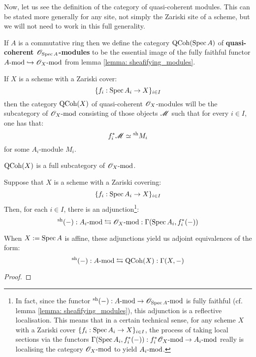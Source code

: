         Now, let us see the definition of the category of quasi-coherent modules. This can be stated more generally for any site, not simply the Zariski site of a scheme, but we will not need to work in this full generality.
        \begin{definition} \label{def: quasi_coherent_modules}
            If $A$ is a commutative ring then we define the category $\QCoh(\Spec A)$ of \textbf{quasi-coherent $\scrO_{\Spec A}$-modules} to be the essential image of the fully faithful functor $A\mod \hookrightarrow \scrO_X\mod$ from lemma \ref{lemma: sheafifying_modules}.

            If $X$ is a scheme with a Zariski cover:
                $$\{ f_i: \Spec A_i \to X \}_{i \in I}$$
            then the category $\QCoh(X)$ of quasi-coherent $\scrO_X$-modules will be the subcategory of $\scrO_X\mod$ consisting of those objects $\scrM$ such that for every $i \in I$, one has that:
                $$f_i^*\scrM \cong {}^{\sh}M_i$$
            for some $A_i$-module $M_i$.
        \end{definition}
        \begin{remark}
            $\QCoh(X)$ is a full subcategory of $\scrO_X\mod$.
        \end{remark}
        \begin{theorem} \label{theorem: qcoh_global_section_functor_admits_right_adjoint}
            Suppose that $X$ is a scheme with a Zariski covering:
                $$\{f_i: \Spec A_i \to X\}_{i \in I}$$
            Then, for each $i \in I$, there is an adjunction\footnote{In fact, since the functor ${}^{\sh}(-): A\mod \to \scrO_{\Spec A}\mod$ is fully faithful (cf. lemma \ref{lemma: sheafifying_modules}), this adjunction is a reflective localisation. This means that in a certain technical sense, for any scheme $X$ with a Zariski cover $\{f_i: \Spec A_i \to X\}_{i \in I}$, the process of taking local sections via the functors $\Gamma(\Spec A_i, f_i^*(-)): f_i^*\scrO_X\mod \to A_i\mod$ really is localising the category $\scrO_X\mod$ to yield $A_i\mod$.}:
                $${}^{\sh}(-): A_i\mod \leftrightarrows \scrO_X\mod: \Gamma(\Spec A_i, f_i^*(-))$$
                
            When $X := \Spec A$ is affine, these adjunctions yield us adjoint equivalences of the form:
                $${}^{\sh}(-): A\mod \leftrightarrows \QCoh(X): \Gamma(X, -)$$
        \end{theorem}
            \begin{proof}
                
            \end{proof}

